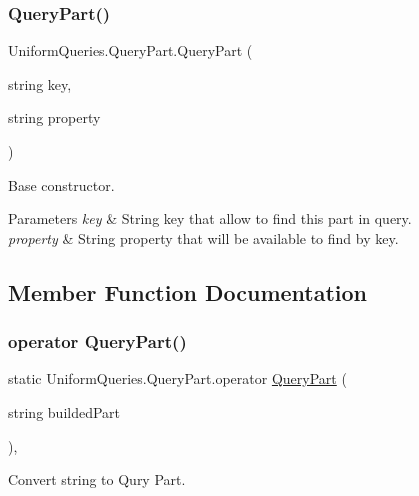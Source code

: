 \subsubsection{\texorpdfstring{Query\+Part()}{QueryPart()}\hspace{0.1cm}{\footnotesize\ttfamily [2/2]}}
{\footnotesize\ttfamily Uniform\+Queries.\+Query\+Part.\+Query\+Part (\begin{DoxyParamCaption}\item[{string}]{key,  }\item[{string}]{property }\end{DoxyParamCaption})}



Base constructor. 


\begin{DoxyParams}{Parameters}
{\em key} & String key that allow to find this part in query.\\
\hline
{\em property} & String property that will be available to find by key.\\
\hline
\end{DoxyParams}


\subsection{Member Function Documentation}
\mbox{\label{struct_uniform_queries_1_1_query_part_ab0c6ca9b91045a64286bf730ad97dc43}} 
\subsubsection{\texorpdfstring{operator Query\+Part()}{operator QueryPart()}}
{\footnotesize\ttfamily static Uniform\+Queries.\+Query\+Part.\+operator \mbox{\hyperlink{struct_uniform_queries_1_1_query_part}{Query\+Part}} (\begin{DoxyParamCaption}\item[{string}]{builded\+Part }\end{DoxyParamCaption})\hspace{0.3cm}{\ttfamily [explicit]}, {\ttfamily [static]}}



Convert string to Qury Part. 


